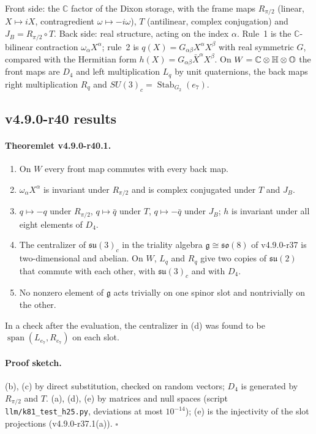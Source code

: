 Front side: the \(\mathbb C\) factor of the Dixon storage, with the frame maps \(R_{\pi/2}\) (linear, \(X\mapsto iX\), contragredient
\(\omega\mapsto-i\omega\)), \(T\) (antilinear, complex conjugation) and \(J_B=R_{\pi/2}\circ T\).  Back side: real structure, acting on
the index \(\alpha\).  Rule~1 is the \(\mathbb C\)-bilinear contraction \(\omega_\alpha X^\alpha\); rule~2 is \(q(X)=G_{\alpha\beta}X^\alpha X^\beta\)
with real symmetric \(G\), compared with the Hermitian form \(h(X)=G_{\alpha\beta}\bar X^\alpha X^\beta\).  On
\(W=\mathbb C\otimes\mathbb{H}\otimes\mathbb{O}\) the front maps are \(D_4\) and left multiplication \(L_q\) by unit quaternions, the back maps right
multiplication \(R_q\) and \(SU(3)_c=\operatorname{Stab}_{G_2}(e_7)\).

\subsection*{v4.9.0-r40 results}
\label{subsec:v490-r40-results}

\paragraph{Theoremlet v4.9.0-r40.1.}
\begin{enumerate}[leftmargin=2em]
\item[(a)] On \(W\) every front map commutes with every back map.
\item[(b)] \(\omega_\alpha X^\alpha\) is invariant under \(R_{\pi/2}\) and is complex conjugated under \(T\) and \(J_B\).
\item[(c)] \(q\mapsto-q\) under \(R_{\pi/2}\), \(q\mapsto\bar q\) under \(T\), \(q\mapsto-\bar q\) under \(J_B\); \(h\) is invariant under all eight
elements of \(D_4\).
\item[(d)] The centralizer of \(\mathfrak{su}(3)_c\) in the triality algebra \(\mathfrak g\cong\mathfrak{so}(8)\) of v4.9.0-r37 is two-dimensional
and abelian.  On \(W\), \(L_q\) and \(R_q\) give two copies of \(\mathfrak{su}(2)\) that commute with each other, with
\(\mathfrak{su}(3)_c\) and with \(D_4\).
\item[(e)] No nonzero element of \(\mathfrak g\) acts trivially on one spinor slot and nontrivially on the other.
\end{enumerate}
In a check after the evaluation, the centralizer in (d) was found to be \(\operatorname{span}(L_{e_7},R_{e_7})\) on each slot.

\paragraph{Proof sketch.}
(b), (c) by direct substitution, checked on random vectors; \(D_4\) is generated by \(R_{\pi/2}\) and \(T\).  (a), (d), (e) by matrices
and null spaces (script \texttt{llm/k81\_test\_h25.py}, deviations at most \(10^{-14}\)); (e) is the injectivity of the slot projections
(v4.9.0-r37.1(a)).  \(\square\)

